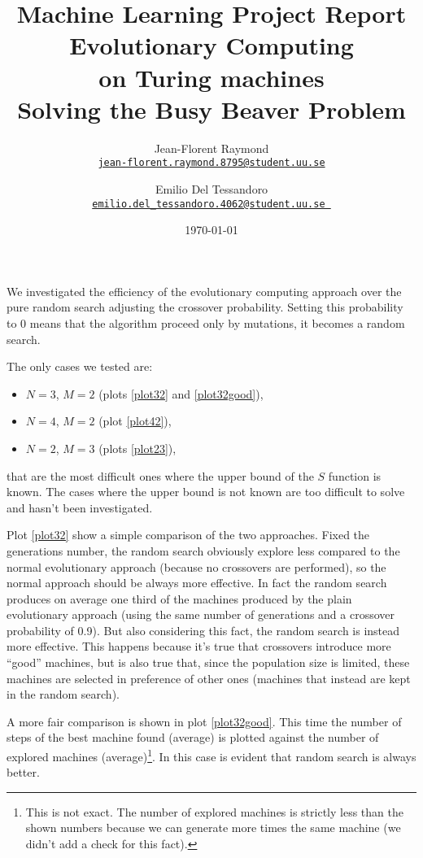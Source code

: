 \documentclass{report}
\title{Machine Learning Project Report\\\textbf{Evolutionary Computing\\on Turing machines}\\{\Large Solving the Busy Beaver Problem}}
\author{Jean-Florent Raymond\\\href{mailto:jean-florent.raymond.8795@student.uu.se}{\texttt{jean-florent.raymond.8795@student.uu.se}} \and Emilio Del Tessandoro\\
  \href{mailto:emilio.del_tessandoro.4062@student.uu.se }{\texttt{emilio.del\_tessandoro.4062@student.uu.se }}}
\date{\today}
\begin{document}

We investigated the efficiency of the evolutionary computing approach over the pure random search adjusting the crossover probability. Setting this probability to 0 means that the algorithm proceed only by mutations, \ie it becomes a random search.

The only cases we tested are:
\begin{itemize}
\item $N = 3$, $M = 2$ (plots \ref{plot32} and \ref{plot32good}),
\item $N = 4$, $M = 2$ (plot \ref{plot42}),
\item $N = 2$, $M = 3$ (plots \ref{plot23}),
\end{itemize}

that are the most difficult ones where the upper bound of the $S$ function is known. The cases where the upper bound is not known are too difficult to solve and hasn't been investigated.

Plot \ref{plot32} show a simple comparison of the two approaches. %
Fixed the generations number, the random search obviously explore less compared to the normal evolutionary approach (because no crossovers are performed), so the normal approach should be always more effective. In fact the random search produces on average one third of the machines produced by the plain evolutionary approach (using the same number of generations and a crossover probability of 0.9).
But also considering this fact, the random search is instead more effective.
This happens because it's true that crossovers introduce more ``good'' machines, but is also true that, since the population size is limited, these machines are selected in preference of other ones (machines that instead are kept in the random search).

A more fair comparison is shown in plot \ref{plot32good}. This time the number of steps of the best machine found (average) is plotted against the number of explored machines (average)\footnote{This is not exact. The number of explored machines is strictly less than the shown numbers because we can generate more times the same machine (we didn't add a check for this fact).}. In this case is evident that random search is always better.
\end{document}

